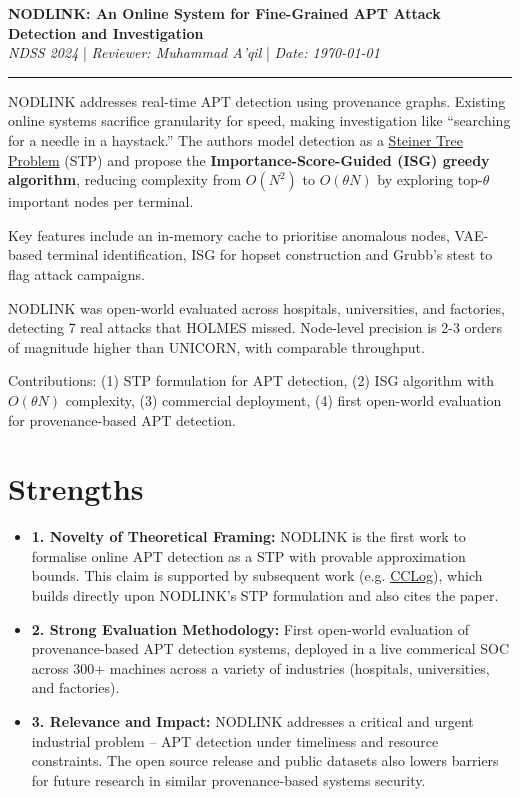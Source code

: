 \documentclass[11pt]{article}
\begin{document}
\begin{center}
    {\large \textbf{NODLINK: An Online System for Fine-Grained APT Attack
Detection and Investigation}} \\[2pt]
    \textit{NDSS 2024} \quad | \quad \textit{Reviewer: Muhammad A'qil} \quad | \quad \textit{Date: \today}
\end{center}
\vspace{4pt}
\hrule
\vspace{8pt}

NODLINK addresses real-time APT detection using provenance graphs. Existing online systems sacrifice granularity for speed, making investigation like ``searching for a needle in a haystack.'' The authors model detection as a \href{https://www.geeksforgeeks.org/dsa/steiner-tree/}{Steiner Tree Problem} (STP) and propose the \textbf{Importance-Score-Guided (ISG) greedy algorithm}, reducing complexity from $O(N^2)$ to $O(\theta N)$ by exploring top-$\theta$ important nodes per terminal.

Key features include an in-memory cache to prioritise anomalous nodes, VAE-based terminal identification, ISG for hopset construction and Grubb's stest to flag attack campaigns.


NODLINK was open-world evaluated across hospitals, universities, and factories, detecting 7 real attacks that HOLMES missed. Node-level precision is 2-3 orders of magnitude higher than UNICORN, with comparable throughput.

Contributions: (1) STP formulation for APT detection, (2) ISG algorithm with $O(\theta N)$ complexity, (3) commercial deployment, (4) first open-world evaluation for provenance-based APT detection.

\section*{Strengths}
\begin{itemize}
    \item \textbf{1. Novelty of Theoretical Framing:}
    NODLINK is the first work to formalise online APT detection as a STP with provable approximation bounds. This claim is supported by subsequent work (e.g. \href{https://www.sciencedirect.com/science/article/abs/pii/S1389128625006279}{CCLog}), which builds directly upon NODLINK's STP formulation and also cites the paper.
    \item \textbf{2. Strong Evaluation Methodology:}
    First open-world evaluation of provenance-based APT detection systems, deployed in a live commerical SOC across 300+ machines across a variety of industries (hospitals, universities, and factories).
    \item \textbf{3. Relevance and Impact:}
    NODLINK addresses a critical and urgent industrial problem -- APT detection under timeliness and resource constraints. The open source release and public datasets also lowers barriers for future research in similar provenance-based systems security. 
\end{itemize}
\end{document}
